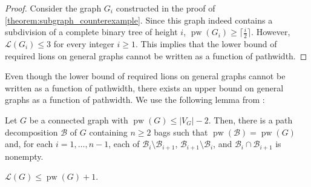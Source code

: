 \documentclass[a4paper,UKenglish,cleveref, autoref, thm-restate]{lipics-v2021}
\begin{document}
\begin{proof}
    Consider the graph $G_i$ constructed in the proof of \cref{theorem:subgraph_counterexample}. Since this graph indeed contains a subdivision of a complete binary tree of height $i$, $\operatorname{pw}(G_i)\geq \lceil \frac{i}{2} \rceil$. However, $\mathcal{L}(G_i)\leq3$ for every integer $i\geq 1$. This implies that the lower bound of required lions on general graphs cannot be written as a function of pathwidth.
\end{proof}

Even though the lower bound of required lions on general graphs cannot be written as a function of pathwidth, there exists an upper bound on general graphs as a function of pathwidth. We use the following lemma from \cite{dereniowski2015zero}:

\begin{lemma}\label{lemma:proper_bag_lemma}
Let $G$ be a connected graph with $\operatorname{pw}(G) \leq |V_G|-2$. Then, there is a path decomposition $\mathcal{B}$ of $G$ containing $n \geq 2$ bags such that $\operatorname{pw}(\mathcal{B})=\operatorname{pw}(G)$ and, for each $i=1,\dots, n-1$, each of $\mathcal{B}_i \setminus \mathcal{B}_{i+1}$, $\mathcal{B}_{i+1} \setminus \mathcal{B}_i$, and $\mathcal{B}_i \cap \mathcal{B}_{i+1}$ is nonempty.
\end{lemma}

\begin{theorem}\label{theorem:upper_bound_on_general_graph_theorem}
$\mathcal{L}(G) \leq \operatorname{pw}(G)+1$.
\end{theorem}
\end{document}
